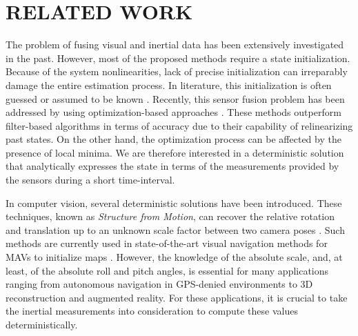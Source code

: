 \documentclass[letterpaper, 10 pt, journal, final]{ieeeconf}  %
\begin{document}

\section{RELATED WORK}

The problem of fusing visual and inertial data has been extensively investigated in the past.
However, most of the proposed methods require a state initialization.
Because of the system nonlinearities, lack of precise initialization can irreparably damage the entire estimation process.
In literature, this initialization is often guessed or assumed to be known \cite{Armesto2007}\cite{Li2013}\cite{Huang2009}\cite{Bibuli2007}\cite{Forster2014}. Recently, this sensor fusion problem has been addressed by using optimization-based approaches \cite{Leute2014}\cite{Forster2015}\cite{mourikis2008dual}\cite{lupton2012visual}\cite{huang2011observability}\cite{mourikis2007multi}. These methods outperform filter-based algorithms in terms of accuracy due to their capability of relinearizing past states. On the other hand, the optimization process can be affected by the presence of local minima.
We are therefore interested in a deterministic solution that analytically expresses the state in terms of the measurements provided by the sensors during a short time-interval.

In computer vision, several deterministic solutions have been introduced.
These techniques, known as {\it Structure from Motion}, can recover the relative rotation and translation up to an unknown scale factor between two camera poses \cite{Longuet-Higgins1981}\cite{Nister2003}\cite{Hartley2004}\cite{Li2006}.
Such methods are currently used in state-of-the-art visual navigation methods for MAVs to initialize maps \cite{Weiss2012}\cite{Forster2014}\cite{FaesslerICRA15}.
However, the knowledge of the absolute scale, and, at least, of the absolute roll and pitch angles, is essential for many applications ranging from autonomous navigation in GPS-denied environments to 3D reconstruction and augmented reality.
For these applications, it is crucial to take the inertial measurements into consideration to compute these values deterministically.
\end{document}
